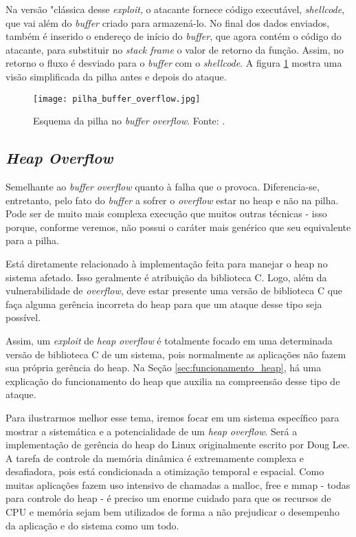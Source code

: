 			
			Na versão "clássica desse \textsl{exploit}, o atacante fornece
			código executável, \textsl{shellcode}, que vai além do \textsl{buffer} criado para
			armazená-lo. No final dos dados enviados, também é inserido o endereço de início
			do \textsl{buffer}, que agora contém o código do atacante, para substituir no
			\textsl{stack frame} o valor de retorno da função. Assim, no retorno o fluxo
			é desviado para o \textsl{buffer} com o \textsl{shellcode}. A figura 
			\ref{fig:pilha_buffer_overflow} mostra uma visão simplificada da pilha
			antes e depois do ataque. 

			\begin{figure}
				\begin{center}
					\texttt{[image: pilha\_buffer\_overflow.jpg]}
					\caption{Esquema da pilha no \textsl{buffer overflow}. Fonte: \cite{Martins2009}.}
					\label{fig:pilha_buffer_overflow}
				\end{center}
			\end{figure}

		\subsection{\textsl{Heap Overflow}}
			Semelhante ao \textsl{buffer overflow} quanto à falha que o provoca.
			Diferencia-se, entretanto, pelo fato do \textsl{buffer} a sofrer o \textsl{overflow}
			estar no heap e não na pilha. Pode ser de muito mais complexa execução que
			muitos outras técnicas - isso porque, conforme veremos, não possui o caráter
			mais genérico que seu equivalente para a pilha.
			
			
			Está diretamente relacionado à implementação feita para manejar o heap no sistema
			afetado. Isso geralmente é atribuição da biblioteca C. Logo, além da vulnerabilidade
			de \textsl{overflow}, deve estar presente uma versão de biblioteca C que faça alguma
			gerência incorreta do heap para que um ataque desse tipo seja possível.

			
			Assim, um \textsl{exploit} de \textsl{heap overflow} é totalmente focado
			em uma determinada versão de biblioteca C de um sistema, pois normalmente as aplicações
			não fazem sua própria gerência do heap. Na Seção \ref{sec:funcionamento_heap}, há
			uma explicação do funcionamento do heap que auxilia na compreensão desse tipo de ataque.
			

			Para ilustrarmos melhor esse tema, iremos focar em um sistema específico
			para mostrar a sistemática e a potencialidade de um \textsl{heap overflow}.
			Será a implementação de gerência do heap do Linux originalmente escrito por Doug Lee.
			A tarefa de controle da memória dinâmica é extremamente complexa e desafiadora, pois
			está condicionada a otimização temporal e espacial. Como muitas aplicações fazem
			uso intensivo de chamadas a malloc, free e mmap - todas para controle do heap - é preciso 
			um enorme cuidado para que os recursos de CPU e memória sejam bem utilizados de forma
			a não prejudicar o desempenho da aplicação e do sistema como um todo.



